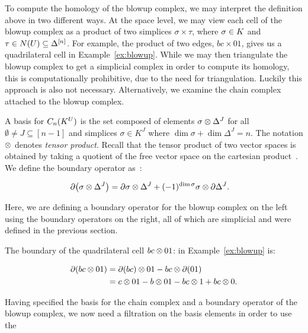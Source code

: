 \documentclass{elsarticle}
\begin{document}
To compute the homology of the blowup complex, we may interpret the definition 
above in two different ways.  
At the space level, we may view each cell of the blowup complex as a product 
of two simplices $\sigma \times \tau$, where 
$\sigma \in K$ and $\tau \in N(U) \subseteq \Delta^{[n]}$.  
For example, the product of two edges, $bc \times 01$, gives us a 
quadrilateral cell in Example~\ref{ex:blowup}.  
While we may then triangulate the blowup complex to get a simplicial complex in order 
to compute its homology, this is computationally prohibitive, due to the need for triangulation. 
Luckily this approach is also not necessary. Alternatively, we 
examine the chain complex attached to the blowup complex.

A basis for $C_n(K^U)$ is the set composed of elements 
$\sigma \otimes \Delta^J$ for all $\emptyset \not = J \subseteq [n-1]$ and 
simplices $\sigma \in K^J$ where $\dim{\sigma} + \dim{\Delta^J} = n$.  The notation
$\otimes$ denotes \emph{tensor product}. Recall that the tensor product of two 
vector spaces is obtained by taking a quotient of the free vector space
on the cartesian product~\cite[\textrm{Page }218]{hatcher}.
We define the boundary operator as~\cite[\textrm{Lemma }4]{zc-lh-08}:
\begin{linenomath*}
\begin{align*}
\partial{\left (\sigma \otimes\Delta^J \right)}
&=
\partial{\sigma} \otimes \Delta^J + 
(-1)^{\dim{\sigma}}\sigma \otimes \partial\Delta^J.
\end{align*}
\end{linenomath*}
Here, we are defining a boundary operator for the blowup complex on the left 
using the boundary operators on the right, all of which are simplicial and were 
defined in the previous section. 
\begin{example}
The boundary of the quadrilateral cell 
$bc \otimes 01$: in Example~\ref{ex:blowup} is:
\begin{linenomath*}
\begin{align*}
\partial{\left (bc \otimes01 \right)}
&=
\partial{(bc)} \otimes 01 - bc \otimes \partial(01) \\
&= c \otimes 01 - b \otimes 01 - bc \otimes 1 + bc \otimes 0.
\end{align*}
\end{linenomath*}
\end{example}
Having specified the basis for the chain complex and a boundary operator of 
the blowup complex, we now need a filtration on the basis elements in order to use the 
\end{document}
